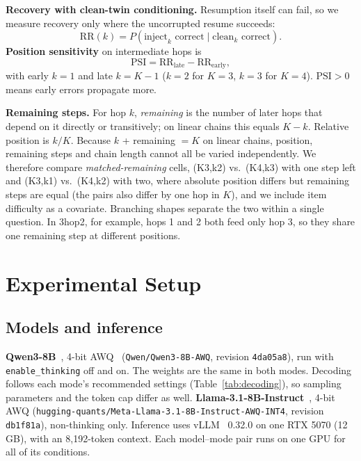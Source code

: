 \documentclass[conference]{IEEEtran}
\newcommand{\RR}{\mathrm{RR}}
\newcommand{\PSI}{\mathrm{PSI}}
\begin{document}
\textbf{Recovery with clean-twin conditioning.} Resumption itself can fail, so we measure recovery only where the uncorrupted resume succeeds:
\begin{equation}
\RR(k) = P\left(\text{inject}_k \text{ correct} \mid \text{clean}_k \text{ correct}\right).
\end{equation}
\textbf{Position sensitivity} on intermediate hops is
\begin{equation}
\PSI = \RR_{\text{late}} - \RR_{\text{early}},
\end{equation}
with early $k{=}1$ and late $k{=}K{-}1$ ($k{=}2$ for $K{=}3$, $k{=}3$ for $K{=}4$). $\PSI>0$ means early errors propagate more.

\textbf{Remaining steps.} For hop $k$, \emph{remaining} is the number of later hops that depend on it directly or transitively; on linear chains this equals $K-k$. Relative position is $k/K$. Because $k$ + remaining $=K$ on linear chains, position, remaining steps and chain length cannot all be varied independently. We therefore compare \emph{matched-remaining} cells, (K3,k2) vs.\ (K4,k3) with one step left and (K3,k1) vs.\ (K4,k2) with two, where absolute position differs but remaining steps are equal (the pairs also differ by one hop in $K$), and we include item difficulty as a covariate. Branching shapes separate the two within a single question. In 3hop2, for example, hops 1 and 2 both feed only hop 3, so they share one remaining step at different positions.

\section{Experimental Setup}
\label{sec:setup}

\subsection{Models and inference}
\textbf{Qwen3-8B}~\cite{qwen3}, 4-bit AWQ~\cite{awq} (\texttt{Qwen/Qwen3-8B-AWQ}, revision \texttt{4da05a8}), run with \texttt{enable\_thinking} off and on. The weights are the same in both modes. Decoding follows each mode's recommended settings (Table~\ref{tab:decoding}), so sampling parameters and the token cap differ as well.
\textbf{Llama-3.1-8B-Instruct}~\cite{llama3}, 4-bit AWQ (\texttt{hugging-quants/\allowbreak Meta-Llama-3.1-8B-\allowbreak Instruct-AWQ-INT4}, revision \texttt{db1f81a}), non-thinking only.
Inference uses vLLM~\cite{vllm} 0.32.0 on one RTX 5070 (12\,GB), with an 8{,}192-token context. Each model--mode pair runs on one GPU for all of its conditions.
\end{document}
